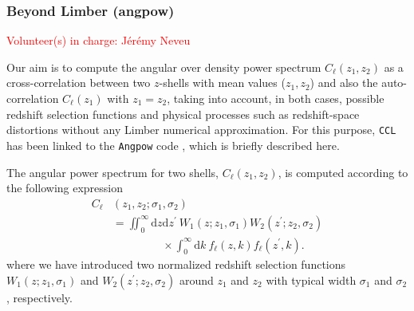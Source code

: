 \documentclass[\docopts]{\docclass}
\newcommand{\vol}[1]{\textcolor{red}{Volunteer(s) in charge: #1}}
\newcommand{\ccl}{{\tt CCL}\xspace}
\begin{document}
\subsubsection{Beyond Limber (angpow)}
\vol{J\'er\'emy Neveu}

Our aim is to compute the angular over density power spectrum  $C_{\ell}(z_1, z_2)$ as a cross-correlation between two $z$-shells with mean values ($z_1, z_2$) and also the auto-correlation $C_{\ell}(z_1)$ with $z_1 = z_2$,  taking into account, in both cases, possible redshift selection functions and physical processes such as redshift-space distortions without any Limber numerical approximation. For this purpose, \ccl has been linked to the \texttt{Angpow} code \citep{2017arXiv170103592C}, which is briefly described here.

The angular power spectrum for two shells, $C_{\ell}(z_1, z_2)$, is computed according to the following expression
\begin{equation}
\begin{split}
C_{\ell}&(z_1, z_2;\sigma_1, \sigma_2)\\& = \iint_0^\infty \mathrm{d} z \mathrm{d} z^\prime \ W_1(z; z_1, \sigma_1) W_2(z^\prime; z_2, \sigma_2)\\
&\phantom{\iint_0^\infty \mathrm{d} z \mathrm{d} z^\prime} \times \int_0^\infty \mathrm{d} k\ f_{\ell}(z, k) f_{\ell}(z^\prime, k). 
\end{split}
\label{eq-clz1z2-obs}
\end{equation}
%
where we have introduced two normalized redshift selection functions $W_1(z;z_1,\sigma_1)$ and $W_2(z^\prime;z_2,\sigma_2)$  around $z_1$ and $z_2$ with typical width $\sigma_1$ and $\sigma_2$, respectively.
\end{document}
